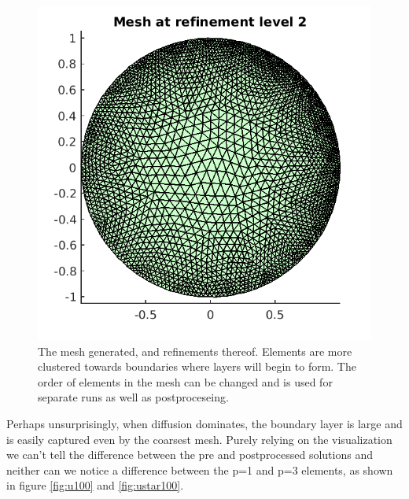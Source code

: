 \documentclass{article}
\begin{document}
\begin{figure}[!ht]
\includegraphics[scale=0.5]{um_3.png}
\caption{The mesh generated, and refinements thereof. Elements are more clustered towards boundaries where layers will begin to form. The order of elements in the mesh can be changed and is used for separate runs as well as postproceseing.}
\end{figure}

Perhaps unsurprisingly, when diffusion dominates, the boundary layer is large and is easily captured even by the coarsest mesh.
Purely relying on the visualization we can't tell the difference between the pre and postprocessed solutions and neither can we notice a difference between the p=1 and p=3 elements, as shown in figure \ref{fig:u100} and \ref{fig:ustar100}.
\end{document}
